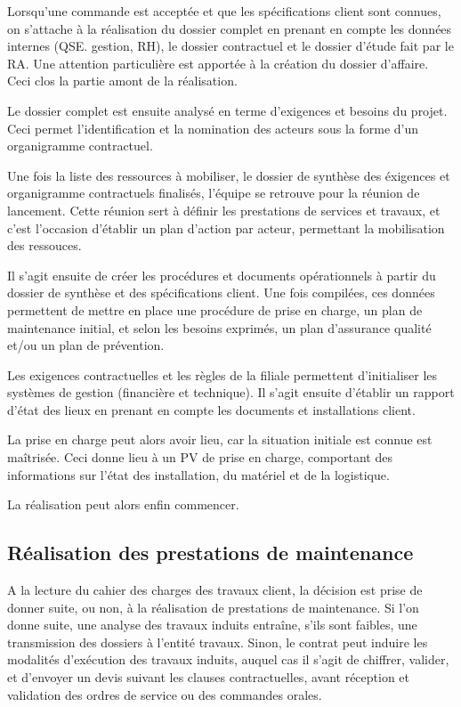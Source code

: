 Lorsqu'une commande est acceptée et que les spécifications client sont connues, on s'attache à la réalisation du dossier complet en prenant en compte les données internes (QSE. gestion, RH), le dossier contractuel et le dossier d'étude fait par le RA. Une attention particulière est apportée à la création du dossier d'affaire. Ceci clos la partie amont de la réalisation.

Le dossier complet est ensuite analysé en terme d'exigences et besoins du projet. Ceci permet l'identification et la nomination des acteurs sous la forme d'un organigramme contractuel.

Une fois la liste des ressources à mobiliser, le dossier de synthèse des éxigences et organigramme contractuels finalisés, l'équipe se retrouve pour la réunion de lancement. Cette réunion sert à définir les prestations de services et travaux, et c'est l'occasion d'établir un plan d'action par acteur, permettant la mobilisation des ressouces\footnotemark.


Il s’agit ensuite de créer les procédures et documents opérationnels à partir du dossier de synthèse et des spécifications client. Une fois compilées, ces données permettent de mettre en place une procédure de prise en charge, un plan de maintenance initial, et selon les besoins exprimés, un plan d’assurance qualité et/ou un plan de prévention.

Les exigences contractuelles et les règles de la filiale permettent d'initialiser les systèmes de gestion (financière et technique). Il s'agit ensuite d'établir un rapport d'état des lieux en prenant en compte les documents et installations client.

La prise en charge peut alors avoir lieu, car la situation initiale est connue est maîtrisée. Ceci donne lieu à un PV de prise en charge, comportant des informations sur l'état des installation, du matériel et de la logistique.

La réalisation peut alors enfin commencer.

\subsection{Réalisation des prestations de maintenance}

A la lecture du cahier des charges des travaux client, la décision est prise de donner suite, ou non, à la réalisation de prestations de maintenance. Si l’on donne suite, une analyse des travaux induits entraîne, s’ils sont faibles, une transmission des dossiers à l’entité travaux. Sinon, le contrat peut induire les modalités d’exécution des travaux induits, auquel cas il s’agit de chiffrer, valider, et d’envoyer un devis suivant les clauses contractuelles, avant réception et validation des ordres de service ou des commandes orales.

